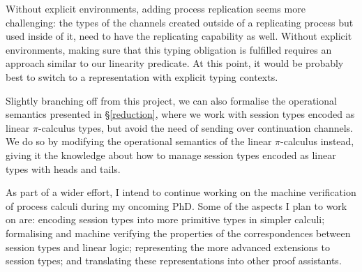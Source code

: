 \documentclass{mproj}
\newcommand{\picalc}{$\pi$-calculus}
\begin{document}
Without explicit environments, adding process replication seems more challenging: the types of the channels created outside of a replicating process but used inside of it, need to have the replicating capability as well. Without explicit environments, making sure that this typing obligation is fulfilled requires an approach similar to our linearity predicate. At this point, it would be probably best to switch to a representation with explicit typing contexts.

Slightly branching off from this project, we can also formalise the operational semantics presented in \S \ref{reduction}, where we work with session types encoded as linear \picalc{} types, but avoid the need of sending over continuation channels. We do so by modifying the operational semantics of the linear \picalc{} instead, giving it the knowledge about how to manage session types encoded as linear types with heads and tails.

As part of a wider effort, I intend to continue working on the machine verification of process calculi during my oncoming PhD. Some of the aspects I plan to work on are: encoding session types into more primitive types in simpler calculi; formalising and machine verifying the properties of the correspondences between session types and linear logic; representing the more advanced extensions to session types; and translating these representations into other proof assistants. 



\end{document}

